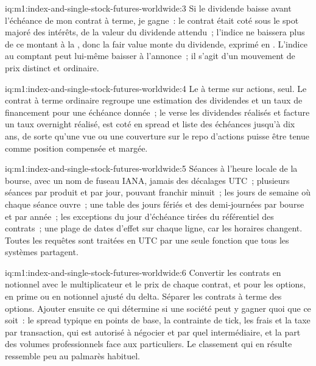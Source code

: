 \begin{solution}{iq:m1:index-and-single-stock-futures-worldwide:3}
Si le dividende baisse avant l'échéance de mon contrat à terme, je gagne~: le contrat était
coté sous le spot majoré des intérêts, de la valeur du dividende attendu~; l'indice ne
baissera plus de ce montant à la , donc la fair value monte du
dividende, exprimé en . L'indice au comptant peut lui-même baisser à l'annonce~;
il s'agit d'un mouvement de prix distinct et ordinaire.
\end{solution}

\begin{solution}{iq:m1:index-and-single-stock-futures-worldwide:4}
Le  à terme sur actions, seul. Le contrat à terme ordinaire regroupe une
estimation des dividendes et un taux de financement pour une échéance donnée~; le  verse les dividendes réalisés et facture un taux overnight réalisé, est
coté en spread et liste des échéances jusqu'à dix ans, de sorte qu'une vue ou une couverture
sur le repo d'actions puisse être tenue comme position compensée et margée.
\end{solution}

\begin{solution}{iq:m1:index-and-single-stock-futures-worldwide:5}
Séances à l'heure locale de la bourse, avec un nom de fuseau IANA, jamais des décalages UTC~;
plusieurs séances par produit et par jour, pouvant franchir minuit~; les jours de semaine
où chaque séance ouvre~; une table des jours fériés et des demi-journées par bourse et par année~;
les exceptions du jour d'échéance tirées du référentiel des contrats~; une plage de dates d'effet
sur chaque ligne, car les horaires changent. Toutes les requêtes sont traitées en UTC
par une seule fonction que tous les systèmes partagent.
\end{solution}

\begin{solution}{iq:m1:index-and-single-stock-futures-worldwide:6}
Convertir les contrats en notionnel avec le multiplicateur et le prix de chaque contrat, et
pour les options, en prime ou en notionnel ajusté du delta. Séparer les contrats à terme des
options. Ajouter ensuite ce qui détermine si une société peut y gagner quoi que ce soit~:
le spread typique en points de base, la contrainte de tick, les frais et la taxe par transaction, qui
est autorisé à négocier et par quel intermédiaire, et la part des volumes
professionnels face aux particuliers. Le classement qui en résulte ressemble peu
au palmarès habituel.
\end{solution}
